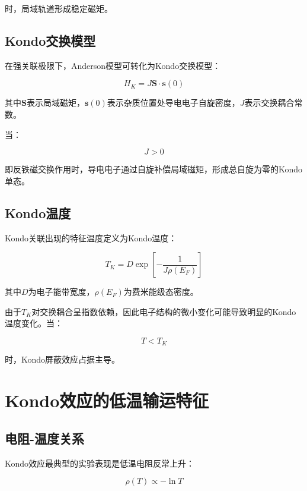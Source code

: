 \documentclass[10.5pt]{article}
\begin{document}
时，局域轨道形成稳定磁矩。


\subsection{Kondo交换模型}

在强关联极限下，Anderson模型可转化为Kondo交换模型：

\begin{equation}
H_K=J\bm{S}\cdot\bm{s}(0)
\end{equation}

其中$\bm{S}$表示局域磁矩，$\bm{s}(0)$表示杂质位置处导电电子自旋密度，$J$表示交换耦合常数。

当：

\begin{equation}
J>0
\end{equation}

即反铁磁交换作用时，导电电子通过自旋补偿局域磁矩，形成总自旋为零的Kondo单态。


\subsection{Kondo温度}

Kondo关联出现的特征温度定义为Kondo温度：

\begin{equation}
T_K=
D\exp
\left[
-\frac{1}{J\rho(E_F)}
\right]
\end{equation}

其中$D$为电子能带宽度，$\rho(E_F)$为费米能级态密度。

由于$T_K$对交换耦合呈指数依赖，因此电子结构的微小变化可能导致明显的Kondo温度变化。当：

\begin{equation}
T<T_K
\end{equation}

时，Kondo屏蔽效应占据主导。


\section{Kondo效应的低温输运特征}

\subsection{电阻-温度关系}

Kondo效应最典型的实验表现是低温电阻反常上升：

\begin{equation}
\rho(T)\propto-\ln T
\end{equation}
\end{document}
